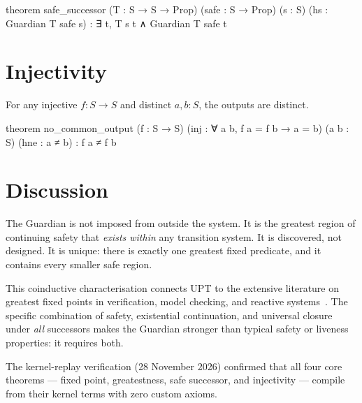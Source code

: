 \begin{leancode}
theorem safe_successor (T : S → S → Prop)
    (safe : S → Prop) (s : S)
    (hs : Guardian T safe s) :
    ∃ t, T s t ∧ Guardian T safe t
\end{leancode}

\section{Injectivity}

\begin{theorem}\label{thm:injective}
For any injective $f : S \to S$ and distinct $a, b : S$, the outputs are distinct.
\end{theorem}

\begin{leancode}
theorem no_common_output (f : S → S)
    (inj : ∀ a b, f a = f b → a = b)
    (a b : S) (hne : a ≠ b) : f a ≠ f b
\end{leancode}

\section{Discussion}

The Guardian is not imposed from outside the system. It is the greatest region of continuing safety that \emph{exists within} any transition system. It is discovered, not designed. It is unique: there is exactly one greatest fixed predicate, and it contains every smaller safe region.

This coinductive characterisation connects UPT to the extensive literature on greatest fixed points in verification, model checking, and reactive systems~\cite{park1969, kozen1983}. The specific combination of safety, existential continuation, and universal closure under \emph{all} successors makes the Guardian stronger than typical safety or liveness properties: it requires both.

The kernel-replay verification (28 November 2026) confirmed that all four core theorems --- fixed point, greatestness, safe successor, and injectivity --- compile from their kernel terms with zero custom axioms.

\bigskip

